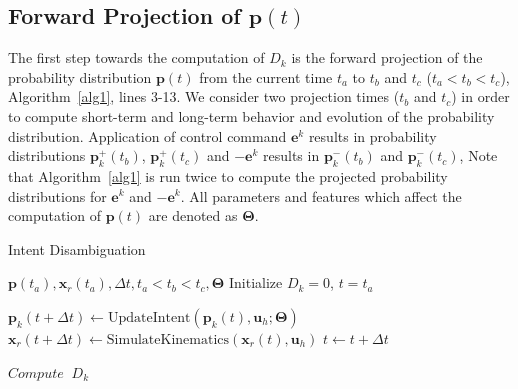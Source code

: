 \documentclass[natbib, twocolumn]{svjour3}          %
\begin{document}
\subsection{Forward Projection of $\boldsymbol{p}(t)$}\label{ssec:projection}
The first step towards the computation of $D_k$ is the forward projection of the probability distribution $\boldsymbol{p}(t)$ from the current time $t_a$ to $t_b$ and $t_c$ ($t_a < t_b < t_c$), Algorithm~\ref{alg1}, lines 3-13. We consider two projection times ($t_b$ and $t_c$) in order to compute short-term and long-term behavior and evolution of the probability distribution. Application of control command $\boldsymbol{e}^k$ results in probability distributions $\boldsymbol{p}^+_k(t_b)$, $\boldsymbol{p}^+_k(t_c)$ and $-\boldsymbol{e}^k$ results in $\boldsymbol{p}^-_k(t_b)$ and $\boldsymbol{p}^-_k(t_c)$,  Note that Algorithm~\ref{alg1} is run twice to compute the projected probability distributions for $\boldsymbol{e}^k$ and $-\boldsymbol{e}^k$. All parameters and features which affect the computation of $\boldsymbol{p}(t)$ are denoted as $\boldsymbol{\Theta}$. 

\begin{algorithm}[t]
	\caption{Intent Disambiguation}
	\label{alg1}
	\begin{algorithmic}[1]
		\REQUIRE $\boldsymbol{p}(t_a), \boldsymbol{x}_r(t_a), \Delta t, t_a < t_b < t_c, \boldsymbol{\Theta}$
		\STATE Initialize $D_k = 0$, $t = t_a$

			\STATE $\boldsymbol{p}_k(t + \Delta t) \leftarrow \text{UpdateIntent}(\boldsymbol{p}_k(t), \boldsymbol{u}_h; \boldsymbol{\Theta})$
			\STATE $\boldsymbol{x}_r(t + \Delta t) \leftarrow \text{SimulateKinematics}(\boldsymbol{x}_r(t), \boldsymbol{u}_h)$
			  
			\ENDIF
			  \ENDIF
			\STATE $t \leftarrow t + \Delta t$
		\ENDWHILE

		\STATE $Compute \;\;D_k$
		\ENDFOR
		
	\end{algorithmic}
\end{algorithm}
\end{document}
